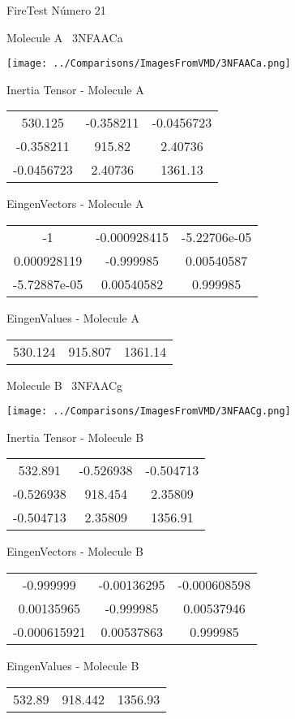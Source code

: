 \vtab[-3cm]
\begin{center}
{\large FireTest \tab Número 21}
\end{center}
\begin{multicols}{2}
\begin{center}

Molecule A \
3NFAACa

\texttt{[image: ../Comparisons/ImagesFromVMD/3NFAACa.png]}

Inertia Tensor - Molecule A \\
\begin{tabular}{|c c c|}
530.125	 & 	-0.358211	 & 	-0.0456723	 \\
-0.358211	 & 	915.82	 & 	2.40736	 \\
-0.0456723	 & 	2.40736	 & 	1361.13
\end{tabular}

\vtab
 EingenVectors - Molecule A     \\
\begin{tabular}{|c c c|}
-1	 & 	-0.000928415	 & 	-5.22706e-05	 \\
0.000928119	 & 	-0.999985	 & 	0.00540587	 \\
-5.72887e-05	 & 	0.00540582	 & 	0.999985
\end{tabular}

\vtab
 EingenValues - Molecule A     \\
\begin{tabular}{|c c c|}
530.124	 & 	915.807	 & 	1361.14	 \\
\end{tabular}
\columnbreak

Molecule B \
3NFAACg

\texttt{[image: ../Comparisons/ImagesFromVMD/3NFAACg.png]}

Inertia Tensor - Molecule B \\
\begin{tabular}{|c c c|}
532.891	 & 	-0.526938	 & 	-0.504713	 \\
-0.526938	 & 	918.454	 & 	2.35809	 \\
-0.504713	 & 	2.35809	 & 	1356.91
\end{tabular}

\vtab
 EingenVectors - Molecule B     \\
\begin{tabular}{|c c c|}
-0.999999	 & 	-0.00136295	 & 	-0.000608598	 \\
0.00135965	 & 	-0.999985	 & 	0.00537946	 \\
-0.000615921	 & 	0.00537863	 & 	0.999985
\end{tabular}

\vtab
 EingenValues - Molecule B     \\
\begin{tabular}{|c c c|}
532.89	 & 	918.442	 & 	1356.93	 \\
\end{tabular}

\end{center}
\end{multicols}

